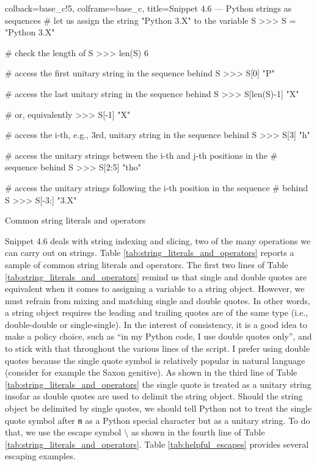 \documentclass[a4paper,11pt]{book}
\numberwithin{figure}{chapter}
\numberwithin{table}{chapter}
\newcommand{\question}[1]{%
    \begin{tcolorbox}[colback=comp_c!10,colframe=comp_c,sidebyside align=top,width=\linewidth,before skip=1ex]
        #1
    \end{tcolorbox}%
    \switchcolumn%
}
\newcommand{\note}[1]{%
    \begin{tcolorbox}[colback=white!0,colframe=white!10,width=\linewidth,before skip=1ex]
        #1
    \end{tcolorbox}         
}
\begin{document}
\begin{pythoncode}[linenos=true,]{colback=base_c!5, colframe=base_c, title=\sffamily Snippet 4.6 --- Python strings as sequences}
# let us assign the string "Python 3.X" to the variable S
>>> S = "Python 3.X"

# check the length of S
>>> len(S)
6

# access the first unitary string in the sequence behind S 	
>>> S[0]
"P"

# access the last unitary string in the sequence behind S
>>> S[len(S)-1]
"X"

# or, equivalently
>>> S[-1]
"X"

# access the i-th, e.g., 3rd, unitary string in the sequence behind S
>>> S[3]
"h"

# access the unitary strings between the i-th and j-th positions in the 
# sequence behind S
>>> S[2:5]
"tho"

# access the unitary strings following the i-th position in the sequence 
# behind S
>>> S[-3:]
"3.X"

\end{pythoncode}
\clearpage

\begin{paracol}{2}
	\question{\raggedright Common string literals and operators}
	\note{Snippet 4.6 deals with string indexing and slicing, two of the many operations we can carry out on strings. Table \ref{tab:string_literals_and_operators} reports a sample of common string literals and operators. The first two lines of Table \ref{tab:string_literals_and_operators} remind us that single and double quotes are equivalent when it comes to assigning a variable to a string object. However, we must refrain from mixing and matching single and double quotes. In other words, a string object requires the leading and trailing quotes are of the same type (i.e., double-double or single-single). In the interest of consistency, it is a good idea to make a policy choice, such as ``in my Python code, I use double quotes only'', and to stick with that throughout the various lines of the script. I prefer using double quotes because the single quote symbol is relatively popular in natural language (consider for example the Saxon genitive). As shown in the third line of Table \ref{tab:string_literals_and_operators} the single quote is treated as a unitary string insofar as double quotes are used to delimit the string object. Should the string object be delimited by single quotes, we should tell Python not to treat the single quote symbol after \texttt{m} as a Python special character but as a unitary string. To do that, we use the escape symbol $\setminus$  as shown in the fourth line of Table \ref{tab:string_literals_and_operators}. Table \ref{tab:helpful_escapes} provides several escaping examples.}
\end{paracol}
\clearpage
\end{document}
